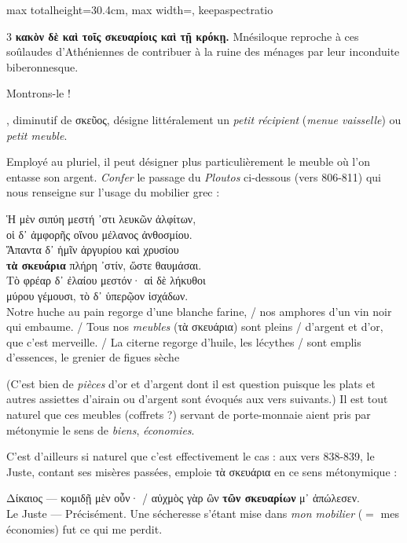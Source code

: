 \documentclass[11pt,twoside]{book}
\newcommand{\italique}[1]{\textit{#1}}
\newcommand{\citComm}[1]{\begin{quoting}[vskip=0.4pt,leftmargin=0.7em,rightmargin=0.2em]#1\end{quoting}}
\newcommand{\francais}[1]{{\policeFr #1}}
\newcommand{\grec}[1]{{\policeGr #1}}
\begin{document}
\begin{adjustbox}{max totalheight=30.4cm, max width=\textwidth, keepaspectratio}
\begin{minipage}{\textwidth}
{\begin{multicols}{3}
 \textbf{κακὸν δὲ καὶ τοῖς σκευαρίοις καὶ τῇ κρόκῃ.} Mnésiloque reproche à ces soûlaudes d'Athéniennes de contribuer à la ruine des ménages par leur inconduite biberonnesque.
\par\vspace{1.5pt}
\noindent Montrons-le !
\par\vspace{1.5pt}
\noindent \grec{τό σκευάριον}, diminutif de σκεῦος, désigne littéralement un \italique{petit récipient} (\italique{menue vaisselle}) ou \italique{petit meuble}.
\par\vspace{1.5pt}
\noindent Employé au pluriel, il peut désigner plus particulièrement le meuble où l'on entasse son argent. \italique{Confer} le passage du \italique{Ploutos} ci-dessous (vers 806-811) qui nous renseigne sur l'usage du mobilier grec :
\citComm{Ἡ μὲν σιπύη μεστή ᾽στι λευκῶν ἀλφίτων,\\
οἱ δ᾽ ἀμφορῆς οἴνου μέλανος ἀνθοσμίου.\\
Ἅπαντα δ᾽ ἡμῖν ἀργυρίου καὶ χρυσίου\\
\textbf{τὰ σκευάρια} πλήρη ᾽στίν, ὥστε θαυμάσαι.\\
Τὸ φρέαρ δ᾽ ἐλαίου μεστόν· αἱ δὲ λήκυθοι\\
μύρου γέμουσι, τὸ δ᾽ ὑπερῷον ἰσχάδων.\\
\francais{Notre huche au pain regorge d'une blanche farine, /
nos amphores d'un vin noir qui embaume. /
Tous nos \italique{meubles}} (τὰ σκευάρια) \francais{sont pleins /
d'argent et d'or, que c'est merveille. /
La citerne regorge d'huile, les lécythes /
sont emplis d'essences, le grenier de figues sèche}}
\par\vspace{1.5pt}
\noindent (C'est bien de \italique{pièces} d'or et d'argent dont il est question puisque les plats et autres assiettes d'airain ou d'argent sont évoqués aux vers suivants.) Il est tout naturel que ces meubles (coffrets ?) servant de porte-monnaie aient pris par métonymie le sens de \italique{biens}, \italique{économies}.
\par\vspace{1.5pt}
\noindent C'est d'ailleurs si naturel que c'est effectivement le cas : aux vers 838-839, le Juste, contant ses misères passées, emploie τὰ σκευάρια en ce sens métonymique :
\citComm{Δίκαιος — κομιδῇ μὲν οὖν· / αὐχμὸς γὰρ ὢν \textbf{τῶν σκευαρίων} μ᾽ ἀπώλεσεν.\\
\francais{Le Juste — Précisément. Une sécheresse s'étant mise dans \italique{mon mobilier} ($=$ mes économies) fut ce qui me perdit.}}

\end{multicols}}
\end{minipage}
\end{adjustbox}
\end{document}
